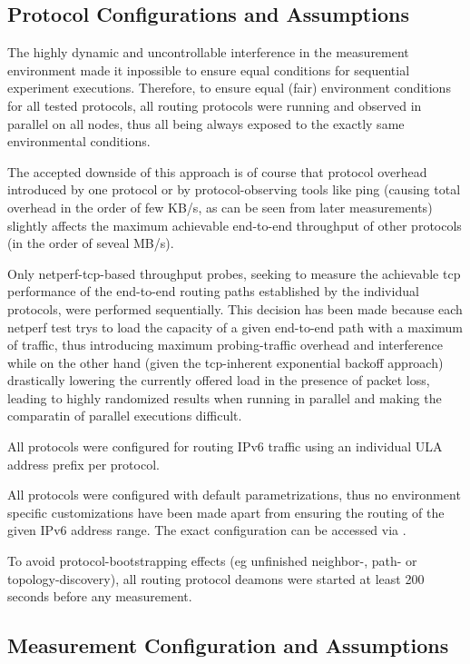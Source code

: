 \documentclass[a4paper,12pt,twoside]{article}
\begin{document}
\subsection{Protocol Configurations and Assumptions}
The highly dynamic and uncontrollable interference in the measurement
environment made it inpossible to ensure equal conditions for
sequential experiment executions. Therefore, to ensure equal (fair)
environment conditions for all tested protocols, all routing protocols
were running and observed in parallel on all nodes, thus all being
always exposed to the exactly same environmental conditions. 

The accepted downside of this approach is of course that protocol
overhead introduced by one protocol or by protocol-observing tools
like ping (causing total overhead in the order of few KB/s, as can be
seen from later measurements) slightly affects the maximum achievable
end-to-end throughput of other protocols (in the order of seveal
MB/s).

Only netperf-tcp-based throughput probes, seeking to measure the
achievable tcp performance of the end-to-end routing paths established
by the individual protocols, were performed sequentially. This
decision has been made because each netperf test trys to load the
capacity of a given end-to-end path with a maximum of traffic, thus
introducing maximum probing-traffic overhead and interference while on
the other hand (given the tcp-inherent exponential backoff approach)
drastically lowering the currently offered load in the presence of
packet loss, leading to highly randomized results when running in
parallel and making the comparatin of parallel executions difficult.


All protocols were configured for routing IPv6 traffic using an
individual ULA address prefix per protocol. 

All protocols were configured with default parametrizations, thus no
environment specific customizations have been made apart from ensuring
the routing of the given IPv6 address range. The exact configuration
can be accessed via \cite{wbm-config}.

To avoid protocol-bootstrapping effects (eg unfinished neighbor-,
path- or topology-discovery), all routing protocol deamons were
started at least 200 seconds before any measurement.

\subsection{Measurement Configuration and Assumptions}
\end{document}
